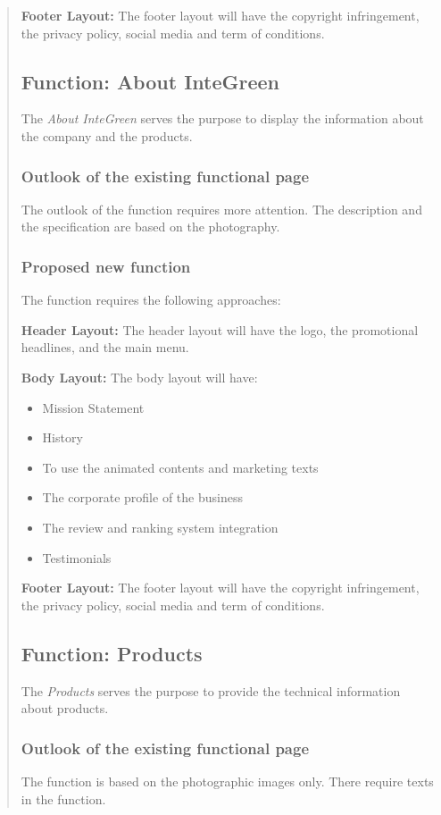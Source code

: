\documentclass[35pt]{report}
\begin{document}
\begin{quote}
				{\bfseries Footer Layout:} The footer layout will have the copyright infringement, the privacy policy, social media and term of conditions.

			\subsection{Function: About InteGreen}
				The {\it About InteGreen} serves the purpose to display the information about the company and the products. 

				\subsubsection{Outlook of the existing functional page}
				The outlook of the function requires more attention. The description and the specification are based on the photography. 

				\subsubsection{Proposed new function}
				The function requires the following approaches:

				{\bfseries Header Layout:} The header layout will have the logo, the promotional headlines, and the main menu.     

				{\bfseries Body Layout:} The body layout will have:
				\begin{itemize}
					\item Mission Statement 
					\item History 
					\item To use the animated contents and marketing texts 
					\item The corporate profile of the business 
					\item The review and ranking system integration 
					\item Testimonials 
				\end{itemize}

				{\bfseries Footer Layout:} The footer layout will have the copyright infringement, the privacy policy, social media and term of conditions.

			\subsection{Function: Products}
				The {\it Products} serves the purpose to provide the technical information about products. 

				\subsubsection{Outlook of the existing functional page}
				The function is based on the photographic images only. There require texts in the 
function. 


\end{quote}
\end{document}
